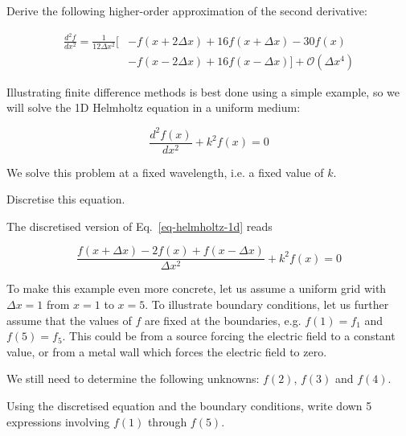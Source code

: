 \pagebreak

\begin{exer}
Derive the following higher-order approximation of the second derivative:

\begin{align}  
  \frac{d^2 f}{d x^2} = \frac{1}{12 \Delta x^2} \big[& -f(x + 2 \Delta x) + 16 f(x + \Delta x) -30 f(x) \nonumber \\
  &  - f(x - 2 \Delta x) + 16 f(x- \Delta x) \big] + \mathcal{O}\left(\Delta x^4\right)
\end{align} 
\end{exer}


\pagebreak



Illustrating finite difference methods is best done using a simple example, so we will solve the 1D Helmholtz equation in a uniform medium:

\begin{equation}
\frac{d^2 f(x)}{d x^2} + k^2 f(x) = 0 \label{eq-helmholtz-1d}
\end{equation} 

We solve this problem at a fixed wavelength, i.e. a fixed value of $k$.

\begin{cue}
  Discretise this equation.
\end{cue}

The discretised version of Eq.~\ref{eq-helmholtz-1d} reads

\begin{equation}
\frac{f(x + \Delta x) -2 f(x) + f(x- \Delta x)}{ \Delta x^2} + k^2 f(x) = 0 \label{eq-hh-diff}
\end{equation}  
 
To make this example even more concrete, let us assume a uniform grid with $\Delta x=1$ from $x=1$ to $x=5$. To illustrate boundary conditions, let us further assume that the values of $f$ are fixed at the boundaries, e.g. $f(1)=f_1$ and $f(5)=f_5$. This could be from a source forcing the electric field to a constant value, or from a metal wall which forces the electric field to zero. 

We still need to determine the following unknowns: $f(2)$, $f(3)$ and $f(4)$.


\begin{cue}
Using the discretised equation and the boundary conditions, write down 5 expressions involving $f(1)$ through $f(5)$.
\end{cue}

